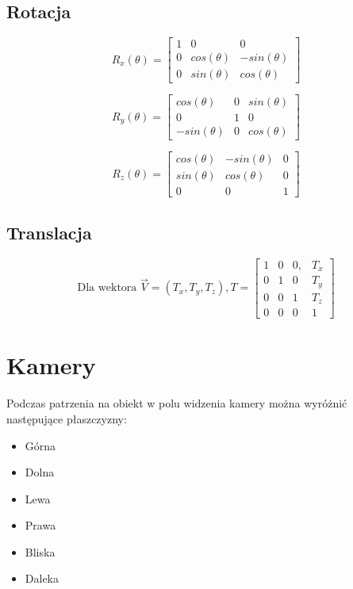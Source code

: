 \documentclass{../notatki}
\begin{document}
\subsection{Rotacja}

$$
R_x(\theta) =
\begin{bmatrix}
  1 & 0 & 0 \\
  0 & cos(\theta) & -sin(\theta) \\
  0 & sin(\theta) & cos(\theta)
\end{bmatrix}
$$

$$
R_y(\theta) =
\begin{bmatrix}
  cos(\theta) & 0 & sin(\theta) \\
  0 & 1 & 0 \\
  -sin(\theta) & 0 & cos(\theta)
\end{bmatrix}
$$

$$
R_z(\theta) =
\begin{bmatrix}
  cos(\theta) & -sin(\theta) & 0 \\
  sin(\theta) & cos(\theta) & 0 \\
  0 & 0 & 1
\end{bmatrix}
$$

\subsection{Translacja}

$$
\text{Dla wektora }
\vec{V}=(T_x, T_y, T_z),
T=
\begin{bmatrix} 1 & 0 & 0, & T_x \\ 0 & 1 & 0 & T_y \\ 0 & 0 & 1 &
  T_z \\ 0 & 0 & 0 & 1
\end{bmatrix}
$$

\section{Kamery}

Podczas patrzenia na obiekt w polu widzenia kamery można wyróżnić
następujące płaszczyzny:

\begin{itemize}
  \item Górna
  \item Dolna
  \item Lewa
  \item Prawa
  \item Bliska
  \item Daleka
\end{itemize}
\end{document}
